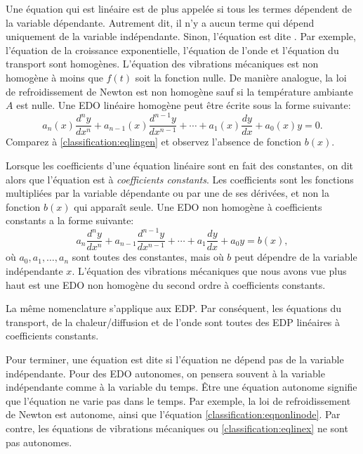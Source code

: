 Une équation qui est linéaire est de plus appelée \emph{} 
si tous les termes dépendent de la variable dépendante.  
Autrement dit, il n'y a aucun terme qui dépend uniquement de la variable indépendante.  
Sinon, l'équation est dite \emph{}.  
Par exemple, l'équation de la croissance exponentielle, l'équation de l'onde et l'équation du transport sont homogènes.  
L'équation des vibrations mécaniques est non homogène à moins que $f(t)$ soit la fonction nulle.  
De manière analogue, la loi de refroidissement de Newton est non homogène sauf si la température ambiante $A$ est nulle.
Une EDO linéaire homogène peut être écrite sous la forme suivante: 
\begin{equation*}
a_n(x) \frac{d^n y}{dx^n} + 
a_{n-1}(x) \frac{d^{n-1} y}{dx^{n-1}} + 
\cdots
+
a_{1}(x) \frac{dy}{dx}
+
a_{0}(x) y = 0 .
\end{equation*}
Comparez à \eqref{classification:eqlingen} et observez l'absence de fonction $b(x)$.

\medskip

Lorsque les coefficients d'une équation linéaire sont en fait des constantes, 
on dit alors que l'équation est à \emph{coefficients constants}.
Les coefficients sont les fonctions multipliées par la variable dépendante ou par une de ses dérivées, 
et non la fonction $b(x)$ qui apparaît seule.
Une EDO non homogène à coefficients constants a la forme suivante: 
\begin{equation*}
	a_n \frac{d^n y}{dx^n} 
		+ a_{n-1} \frac{d^{n-1} y}{dx^{n-1}} 
		+ \cdots
		+ a_{1} \frac{dy}{dx}
		+ a_{0} y 
		= b(x), 
\end{equation*}
où $a_0, a_1, \ldots, a_n$ sont toutes des constantes, mais où 
$b$ peut dépendre de la variable indépendante $x$.
L'équation des vibrations mécaniques que nous avons vue plus haut est une 
EDO non homogène du second ordre à coefficients constants.  

La même nomenclature s'applique aux EDP.  
Par conséquent, les équations du transport, de la chaleur/diffusion et 
de l'onde sont toutes des EDP linéaires à coefficients constants.

\medskip

Pour terminer, une équation est dite \emph{}
 si l'équation ne dépend pas de la variable indépendante.  
 Pour des EDO autonomes, on pensera souvent à la variable indépendante comme à la variable du temps.  
 Être une équation autonome signifie que l'équation ne varie pas dans le temps.  
 Par exemple, la loi de refroidissement de Newton est autonome, ainsi que l'équation \eqref{classification:eqnonlinode}.  
 Par contre, les équations de vibrations mécaniques ou \eqref{classification:eqlinex} ne sont pas autonomes.

